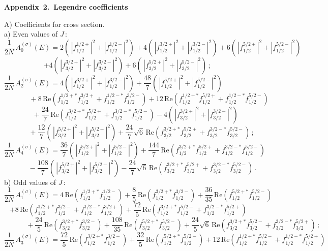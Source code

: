 \documentclass[prc,reprint,onecolumn,amsmath,amssymb,superscriptaddress]{revtex4-1}
\begin{document}
\vspace{5mm}
\centerline{\bf Appendix~2.~Legendre coefficients}
\vspace{2mm}

A) Coefficients for cross section.\\
a) Even values of $J\,$:
$$ 
	\frac1{2N}\,A^{(\sigma)}_0(E)=2\left(\,|f_{1/2}^{1/2+}|^2+|f_{1/2}^{1/2-}|^2\right)+
	4\left(\,|f_{1/2}^{3/2+}|^2+|f_{1/2}^{3/2-}|^2\right)+6\left(\,|f_{1/2}^{5/2+}|^2+|f_{1/2}^{5/2-}|^2\right)
$$
$$ 
	+ 4\left(\,|f_{3/2}^{3/2+}|^2+|f_{3/2}^{3/2-}|^2\right)+6\left(\,|f_{3/2}^{5/2+}|^2+|f_{3/2}^{5/2-}|^2\right)\,;
	~~~~~~
$$
$$ 
	\frac1{2N}\,A^{(\sigma)}_2(E)=4\left(\,|f_{1/2}^{3/2+}|^2+|f_{1/2}^{3/2-}|^2\right)+
	\frac{48}7\left(\,|f_{1/2}^{5/2+}|^2+|f_{1/2}^{5/2-}|^2\right)~~~~~~~~~~~~~~~~~~~~~~~~~~~~$$
$$
	~~~~~~~~~~~~~~~~+8\,\mathrm{Re}\left(f_{1/2}^{1/2+*}f_{1/2}^{3/2+}+f_{1/2}^{1/2-*}f_{1/2}^{3/2-}\right)
	+12\,\mathrm{Re}\left(f_{1/2}^{1/2+*}f_{1/2}^{5/2+}+f_{1/2}^{1/2-*}f_{1/2}^{5/2-}\right)
$$
$$
	~~~~+\frac{24}7\,\mathrm{Re}\left(f_{1/2}^{3/2+*}f_{1/2}^{5/2+}+f_{1/2}^{3/2-*}f_{1/2}^{5/2-}\right)
	-4\left(\,|f_{3/2}^{3/2+}|^2+|f_{3/2}^{3/2-}|^2\right)
$$
$$
	~~~~~~~~~~~~+\frac{12}7\left(\,|f_{3/2}^{5/2+}|^2+|f_{3/2}^{5/2-}|^2\right)
	+\frac{24}7\sqrt{6}\,\mathrm{Re}\left(f_{3/2}^{3/2+*}f_{3/2}^{5/2+}+f_{3/2}^{3/2-*}f_{3/2}^{5/2-}\right)\,;
$$
$$ 
	\frac1{2N}\,A^{(\sigma)}_4(E)=\frac{36}7\left(\,|f_{1/2}^{5/2+}|^2+|f_{1/2}^{5/2-}|^2\right)
	+\frac{144}7\,\mathrm{Re}\left(f_{1/2}^{3/2+*}f_{1/2}^{5/2+}+f_{1/2}^{3/2-*}f_{1/2}^{5/2-}\right)~~~~~~~~
$$
$$
	~~~~~~~~~~~~~ -\frac{108}7\left(\,|f_{3/2}^{5/2+}|^2+|f_{3/2}^{5/2-}|^2\right)
	-\frac{24}7\sqrt{6}\,\mathrm{Re}\left(f_{3/2}^{3/2+*}f_{3/2}^{5/2+}+f_{3/2}^{3/2-*}f_{3/2}^{5/2-}\right)\,.
$$
b) Odd values of $J\,$:
$$
	\frac1{2N}\,A^{(\sigma)}_1(E)=4\,\mathrm{Re}\left(f_{1/2}^{1/2+*}f_{1/2}^{1/2-}\right)
	+\frac{8}{5}\,\mathrm{Re}\left(f_{1/2}^{3/2+*}f_{1/2}^{3/2-}\right)
	+\frac{36}{35}\,\mathrm{Re}\left(f_{1/2}^{5/2+*}f_{1/2}^{5/2-}\right)~~~~~~~~~~~~~~~~~~
$$
$$
	+8\,\mathrm{Re}\left(f_{1/2}^{1/2+*}f_{1/2}^{3/2-}+f_{1/2}^{1/2-*}f_{1/2}^{3/2+}\right)
+\frac{72}5\,\mathrm{Re}\left(f_{1/2}^{3/2+*}f_{1/2}^{5/2-}+f_{1/2}^{3/2-*}f_{1/2}^{5/2+}\right)~~~~~
$$
$$
	~~~~~~~~~~~~~~
	+\frac{24}{5}\,\mathrm{Re}\left(f_{3/2}^{3/2+*}f_{3/2}^{3/2-}\right)
	+\frac{108}{35}\,\mathrm{Re}\left(f_{3/2}^{5/2+*}f_{3/2}^{5/2-}\right)
	+\frac{24}5\sqrt{6}\,\mathrm{Re}\left(f_{3/2}^{3/2+*}f_{3/2}^{5/2-}+f_{3/2}^{3/2-*}f_{3/2}^{5/2+}\right)\,;
$$
$$
	\frac1{2N}\,A^{(\sigma)}_3(E)= \frac{72}{5}\,\mathrm{Re}\left(f_{1/2}^{3/2+*}f_{1/2}^{3/2-}\right)
	+\frac{32}{5}\,\mathrm{Re}\left(f_{1/2}^{5/2+*}f_{1/2}^{5/2-}\right)
	+12\,\mathrm{Re}\left(f_{1/2}^{1/2+*}f_{1/2}^{5/2-}+f_{1/2}^{1/2-*}f_{1/2}^{5/2+}\right)$$
\end{document}
